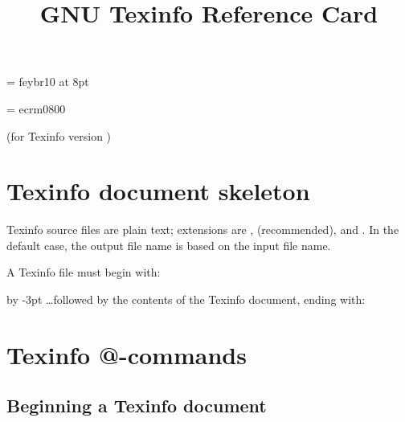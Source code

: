 \def\registeredsymbol{%
 \raise.8ex\hbox{{{\ooalign{\hfil\raise.07ex\hbox{\fiverm R}%
              \hfil\crcr\Orb}}%
   }}%
}

\def\ordf{\leavevmode\raise1ex\hbox{\fiverm \underbar{a}}}
\def\ordm{\leavevmode\raise1ex\hbox{\fiverm \underbar{o}}}

\font\eurofont = feybr10 at 8pt
\def\euro{{\eurofont e}}

\font\ecfont = ecrm0800
\def\DH{{\ecfont \char"D0}} %
\def\dh{{\ecfont \char"F0}} %
\def\TH{{\ecfont \char"DE}} %
\def\th{{\ecfont \char"FE}} %
\def\guillemetleft{{\ecfont \char"13}}
\def\guillemotleft{\guillemetleft}
\def\guillemetright{{\ecfont \char"14}}
\def\guillemotright{\guillemetright}
\def\guilsinglleft{{\ecfont \char"0E}}
\def\guilsinglright{{\ecfont \char"0F}}
\def\quotedblbase{{\ecfont \char"12}}
\def\quotesinglbase{{\ecfont \char"0D}}
\def\ogonek#1{{%
    \ecfont \setbox0=\hbox{#1}%
    \ifdim\ht0=1ex\accent"0C #1%
    \else\ooalign{\unhbox0\crcr\hidewidth\char"0C \hidewidth}%
    \fi
}}
\def\quoteleft{`}
\def\quoteright{'}
\def\quotedblleft{``}
\def\quotedblright{''}


% 
\title{GNU Texinfo Reference Card}

\centerline{(for Texinfo version \versionTexinfo)}
\vskip1pt
\centerline{}

\chapter{Texinfo document skeleton}

Texinfo source files are plain text; extensions are
,  (recommended), and .
In the default case, the output file name is based on the
input file name.

A Texinfo file must begin with:

{\advance\baselineskip by -3pt
\linebreak
\dots followed by the contents of the Texinfo document,
ending with:\linebreak}


\chapter{Texinfo @-commands}

\section{Beginning a Texinfo document}

